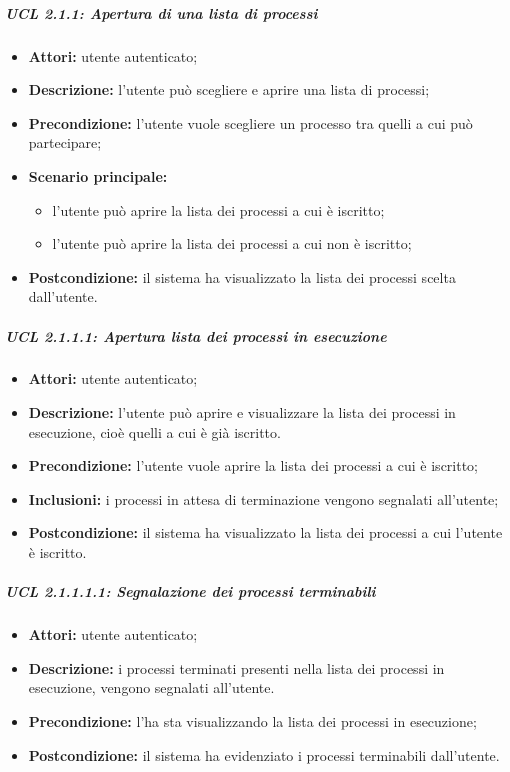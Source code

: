 \subparagraph{UCL 2.1.1: Apertura di una lista di processi}
\begin{itemize}
\item \textbf{Attori:} utente autenticato;
\item \textbf{Descrizione:} l'utente può scegliere e aprire una lista di processi;
\item \textbf{Precondizione:} l'utente vuole scegliere un processo tra quelli a cui può partecipare;
\item \textbf{Scenario principale:}
\begin{itemize}
\item l'utente può aprire la lista dei processi a cui è iscritto;
\item l'utente può aprire la lista dei processi a cui non è iscritto;
\end{itemize}
\item \textbf{Postcondizione:} il sistema ha visualizzato la lista dei processi scelta dall'utente.
\end{itemize}

\subparagraph{UCL 2.1.1.1: Apertura lista dei processi in esecuzione}
\begin{itemize}
\item \textbf{Attori:} utente autenticato;
\item \textbf{Descrizione:} l'utente può aprire e visualizzare la lista dei processi in esecuzione, cioè quelli a cui è già iscritto. 
\item \textbf{Precondizione:} l'utente vuole aprire la lista dei processi a cui è iscritto;
\item \textbf{Inclusioni:} i processi in attesa di terminazione vengono segnalati all'utente;
\item \textbf{Postcondizione:} il sistema ha visualizzato la lista dei processi a cui l'utente è iscritto.
\end{itemize}

\subparagraph{UCL 2.1.1.1.1: Segnalazione dei processi terminabili}
\begin{itemize}
\item \textbf{Attori:} utente autenticato;
\item \textbf{Descrizione:} i processi terminati presenti nella lista dei processi in esecuzione, vengono segnalati all'utente. 
\item \textbf{Precondizione:} l'ha sta visualizzando la lista dei processi in esecuzione;
\item \textbf{Postcondizione:} il sistema ha evidenziato i processi terminabili dall'utente.
\end{itemize}

